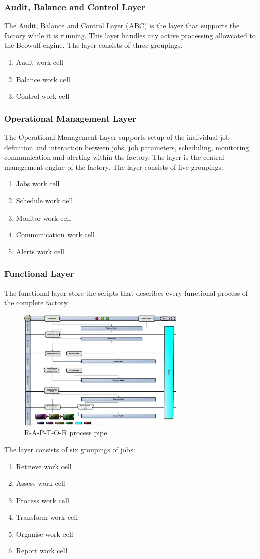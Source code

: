 \documentclass{sigplanconf}
\begin{document}
\subsubsection{Audit, Balance and Control Layer}
The Audit, Balance and Control Layer (ABC) is the layer that supports the factory while it is running.
This layer handles any active processing allowcated to the Beowulf engine.
The layer consists of three groupings.
\begin{enumerate}
  \item Audit work cell
  \item Balance work cell
  \item Control work cell
\end{enumerate}
\subsubsection{Operational Management Layer}
The Operational Management Layer supports setup of the individual job definition and 
interaction between jobs, job parameters, scheduling, monitoring, communication and alerting within the factory. The layer is the central management engine of the factory. The layer consists of five groupings:
\begin{enumerate}
  \item Jobs work cell
  \item Schedule work cell
  \item Monitor work cell
  \item Communication work cell
  \item Alerts work cell
\end{enumerate}
\subsubsection{Functional Layer}
The functional layer store the scripts that describes every functional process of the complete factory.
\begin{figure}
  \centering
  \includegraphics[width=8cm]{RIFF2}
  \caption{R-A-P-T-O-R process pipe}
\end{figure}
The layer consists of six groupings of jobs:
\begin{enumerate}
  \item Retrieve work cell
  \item Assess work cell
  \item Process work cell
  \item Transform work cell
  \item Organise work cell
  \item Report work cell
\end{enumerate}
\end{document}
